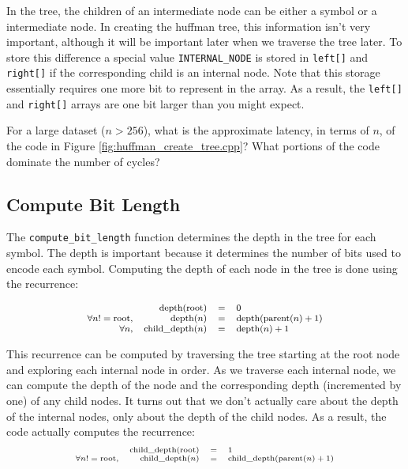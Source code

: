 In the tree, the children of an intermediate node can be either a symbol or a intermediate node.  In creating the huffman tree, this information isn't very important, although it will be important later when we traverse the tree later.  To store this difference
a special value \lstinline{INTERNAL_NODE} is stored in \lstinline{left[]} and \lstinline{right[]} if the corresponding child is an internal node.   Note that this storage essentially requires one more bit to represent in the array.  As a result, the \lstinline{left[]} and \lstinline{right[]} arrays are one bit larger than you might expect. 



\begin{exercise}
For a large dataset ($n > 256$), what is the approximate latency, in terms of $n$, of the code in Figure \ref{fig:huffman_create_tree.cpp}?  What portions of the code dominate the number of cycles?
\end{exercise}

\subsection{Compute Bit Length}

The \lstinline{compute_bit_length} function determines the depth in the tree for each symbol.  The depth is important because it determines the number of bits used to encode each symbol. Computing the depth of each node in the tree is done using the recurrence:

\begin{equation}
\begin{footnotesize}
\begin{array}{rrcl}
&\mathrm{depth}(\mathrm{root}) &=& 0 \\
\forall n != \mathrm{root}, &\mathrm{depth}(n) &=& \mathrm{depth}(\mathrm{parent}(n)+1)\\
\forall n, &\mathrm{child\_depth}(n) &=& \mathrm{depth}(n)+1
\end{array}
\end{footnotesize}
\end{equation}

This recurrence can be computed by traversing the tree starting at the root node and exploring each internal node in order.  As we traverse each internal node, we can compute the depth of the node and the corresponding depth (incremented by one) of any child nodes.  It turns out that we don't actually care about the depth of the internal nodes, only about the depth of the child nodes.  As a result, the code actually computes the recurrence:
\begin{equation}
\begin{scriptsize}
\begin{array}{rrcl}
&\mathrm{child\_depth}(\mathrm{root}) &=& 1 \\
\forall n != \mathrm{root}, &\mathrm{child\_depth}(n) &=& \mathrm{child\_depth}(\mathrm{parent}(n)+1)
\end{array}
\end{scriptsize}
\end{equation}

